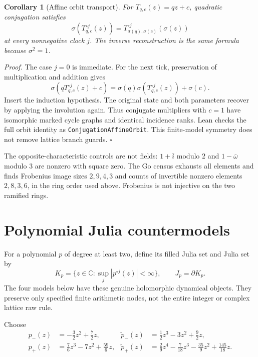 \documentclass[11pt,letterpaper]{article}
\newcommand{\C}{\mathbb{C}}
\newtheorem{corollary}[theorem]{Corollary}
\newenvironment{proof}{\noindent\textit{Proof.}}{\hfill\(\square\)}
\begin{document}
\begin{corollary}[Affine orbit transport]
For \(T_{q,c}(z)=qz+c\), quadratic conjugation satisfies
\[
\sigma(T_{q,c}^{\circ j}(z))
=T_{\sigma(q),\sigma(c)}^{\circ j}(\sigma(z))
\]
at every nonnegative clock \(j\). The inverse reconstruction is the same formula because \(\sigma^2=1\).
\end{corollary}
\begin{proof}
The case \(j=0\) is immediate. For the next tick, preservation of multiplication and addition gives
\[
\sigma(qT_{q,c}^{\circ j}(z)+c)
=\sigma(q)\sigma(T_{q,c}^{\circ j}(z))+\sigma(c).
\]
Insert the induction hypothesis. The original state and both parameters recover by applying the involution again. Thus conjugate multipliers with \(c=1\) have isomorphic marked cycle graphs and identical incidence ranks. Lean checks the full orbit identity as \texttt{ConjugationAffineOrbit}. This finite-model symmetry does not remove lattice branch guards.
\end{proof}

The opposite-characteristic controls are not fields: \(1+\bar i\) modulo \(2\) and \(1-\bar\omega\) modulo \(3\) are nonzero with square zero. The Go census exhausts all elements and finds Frobenius image sizes \(2,9,4,3\) and counts of invertible nonzero elements \(2,8,3,6\), in the ring order used above. Frobenius is not injective on the two ramified rings.

\section{Polynomial Julia countermodels}

For a polynomial \(p\) of degree at least two, define its filled Julia set and Julia set by
\[
K_p=\{z\in\C:\sup_j|p^{\circ j}(z)|<\infty\},
\qquad J_p=\partial K_p.
\]
The four models below have these genuine holomorphic dynamical objects. They preserve only specified finite arithmetic nodes, not the entire integer or complex lattice raw rule.

Choose
\begin{align*}
p_-(z)&=-\frac32z^2+\frac72z,&
\widetilde p_-(z)&=\frac12z^3-3z^2+\frac92z,\\
p_+(z)&=\frac76z^3-7z^2+\frac{59}6z,&
\widetilde p_+(z)&=\frac29z^4-\frac7{18}z^3-\frac{35}9z^2+\frac{145}{18}z.
\end{align*}
\end{document}
